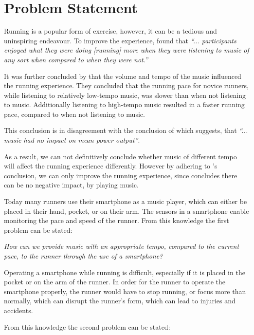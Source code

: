 \section{Problem Statement}
Running is a popular form of exercise, however, it can be a tedious and uninspiring endeavour.
To improve the experience, \citet{musicRunEffectArticle} found that 
\textit{``... participants enjoyed what they were doing [running] more when they were listening to music of any sort when compared to when they were not.''}

It was further concluded by \citet{musicRunEffectArticle} that the volume and tempo of the music influenced the running experience.
They concluded that the running pace for novice runners, while listening to relatively low-tempo music, was slower than when not listening to music. Additionally listening to high-tempo music resulted in a faster running pace, compared to when not listening to music.

This conclusion is in disagreement with the conclusion of \citet{musicNoPerformanceEffect} which suggests, that \textit{``... music had no impact on mean power output''}.

As a result, we can not definitively conclude whether music of different tempo will affect the running experience differently. 
However by adhering to \citet{musicRunEffectArticle}'s conclusion, we can only improve the running experience, since \citet{musicNoPerformanceEffect} concludes there can be no negative impact, by playing music.

Today many runners use their smartphone as a music player, which can either be placed in their hand, pocket, or on their arm.
The sensors in a smartphone enable monitoring the pace and speed of the runner.
From this knowledge the first problem can be stated:

\begin{center}
\textit{How can we provide music with an appropriate tempo, compared to the current pace, to the runner through the use of a smartphone?}
\end{center}

Operating a smartphone while running is difficult, especially if it is placed in the pocket or on the arm of the runner.
In order for the runner to operate the smartphone properly, the runner would have to stop running, or focus more than normally, which can disrupt the runner's form, which can lead to injuries and accidents.

From this knowledge the second problem can be stated: 

